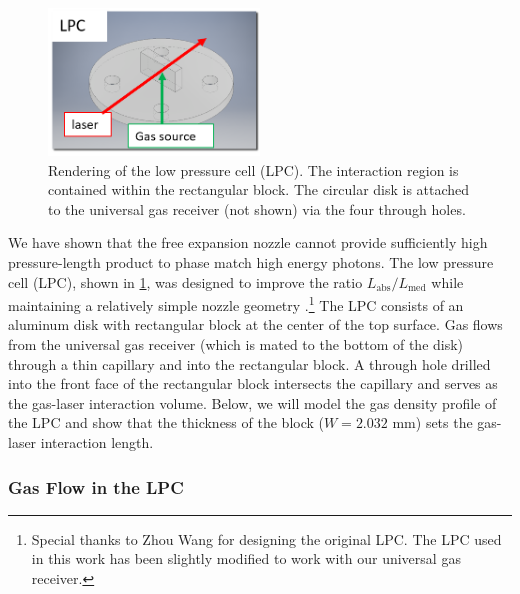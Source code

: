 \begin{figure}
	\centering
	\includegraphics[width=0.5\textwidth]{figures/chap3/LPC_diagram.png}
	\caption{Rendering of the low pressure cell (LPC). The interaction region is contained within the rectangular block. The circular disk is attached to the universal gas receiver (not shown) via the four through holes.}
	\label{fig:LPC_diagram}
\end{figure}

We have shown that the free expansion nozzle cannot provide sufficiently high pressure-length product to phase match high energy photons. The low pressure cell (LPC), shown in \cref{fig:LPC_diagram}, was designed to improve the ratio $L_{\textrm{abs}} / L_{\textrm{med}}$ while maintaining a relatively simple nozzle geometry \cite{wangMidinfraredStrongfieldLaser2018}.\footnote{Special thanks to Zhou Wang for designing the original LPC. The LPC used in this work has been slightly modified to work with our universal gas receiver.} The LPC consists of an aluminum disk with rectangular block at the center of the top surface. Gas flows from the universal gas receiver (which is mated to the bottom of the disk) through a thin capillary and into the rectangular block. A through hole drilled into the front face of the rectangular block intersects the capillary and serves as the gas-laser interaction volume. Below, we will model the gas density profile of the LPC and show that the thickness of the block ($W = 2.032$ mm) sets the gas-laser interaction length.

\subsubsection{Gas Flow in the LPC}

